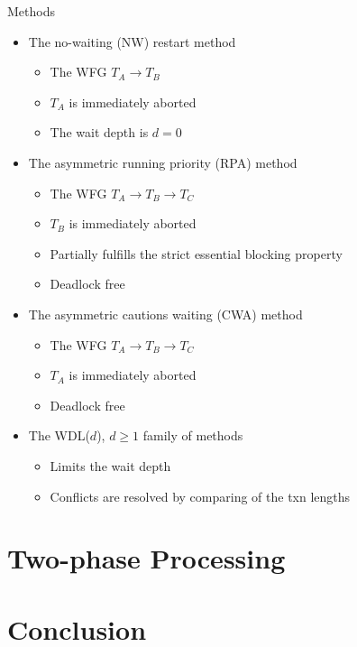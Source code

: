 \documentclass[sans]{beamer}
\begin{document}
\begin{frame}{Methods}
  \begin{itemize}
    \item The no-waiting (NW) restart method
      \begin{itemize}
        \item The WFG $T_A \rightarrow T_B$
        \item $T_A$ is immediately aborted
        \item The wait depth is $d = 0$
      \end{itemize}
    \item The asymmetric running priority (RPA) method
      \begin{itemize}
        \item The WFG $T_A \rightarrow T_B \rightarrow T_C$
        \item $T_B$ is immediately aborted
        \item Partially fulfills the strict essential blocking property
        \item Deadlock free
      \end{itemize}
    \item The asymmetric cautions waiting (CWA) method
      \begin{itemize}
        \item The WFG $T_A \rightarrow T_B \rightarrow T_C$
        \item $T_A$ is immediately aborted
        \item Deadlock free
      \end{itemize}
    \item The WDL($d$), $d \geq 1$ family of methods
      \begin{itemize}
        \item Limits the wait depth
        \item Conflicts are resolved by comparing of the txn lengths
      \end{itemize}
  \end{itemize}
\end{frame}

\section{Two-phase Processing}

\section{Conclusion}
\end{document}
